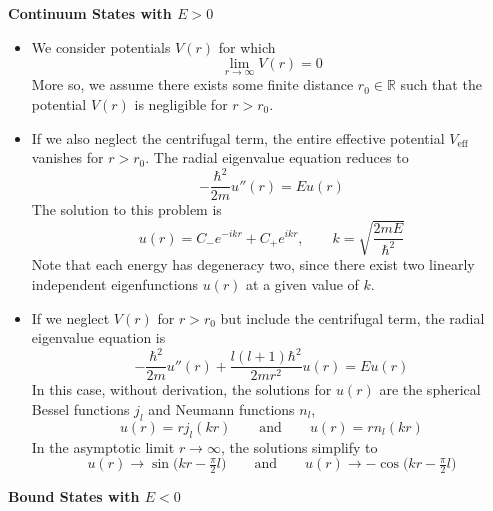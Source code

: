 \documentclass[11pt, a4paper]{article}
\newcommand{\eqtext}[1]{\qquad \text{#1} \qquad}
\begin{document}
\textbf{Continuum States with $ E > 0 $}
\begin{itemize}
	\item We consider potentials $ V(r) $ for which 
	\begin{equation*}
		\lim_{r \to \infty} V(r) = 0
	\end{equation*}
	More so, we assume there exists some finite distance $ r_{0} \in \mathbb{R} $ such that the potential $ V(r) $ is negligible for $ r > r_{0} $. 
	
	\item If we also neglect the centrifugal term, the entire effective potential $ V_{\text{eff}} $ vanishes for $ r > r_{0} $. The radial eigenvalue equation reduces to
	\begin{equation*}
		- \frac{\hbar^{2}}{2m}u''(r) = Eu(r)
	\end{equation*}
	The solution to this problem is
	\begin{equation*}
		u(r) = C_{-}e^{-i k r} + C_{+}e^{i k r}, \qquad k = \sqrt{\frac{2mE}{\hbar^{2}}}
	\end{equation*}
	Note that each energy has degeneracy two, since there exist two linearly independent eigenfunctions $ u(r) $ at a given value of $ k $. 
	
	\item If we neglect $ V(r) $ for $ r > r_{0} $ but include the centrifugal term, the radial eigenvalue equation is
	\begin{equation*}
		-\frac{\hbar^{2}}{2m}u''(r) + \frac{l (l+1)\hbar^{2}}{2mr^{2}}u(r) = E u(r)
	\end{equation*}
	In this case, without derivation, the solutions for $ u(r) $ are the spherical Bessel functions $ j_{l} $ and Neumann functions $ n_{l} $,
	\begin{equation*}
		u(r) = rj_{l}(kr) \eqtext{and} u(r) = r n_{l}(kr)
	\end{equation*}
	In the asymptotic limit $ r \to \infty $, the solutions simplify to
	\begin{equation*}
		u(r) \to \sin\big(kr - \tfrac{\pi}{2}l\big) \eqtext{and} u(r) \to - \cos\big(kr - \tfrac{\pi}{2}l\big)
	\end{equation*}
\end{itemize}
\textbf{Bound States with $ E < 0 $}
\end{document}
